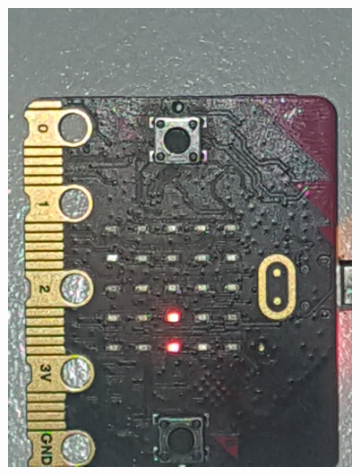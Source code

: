 \begin{figure}[h!]
\begin{subfigure}[b]{0.19\textwidth}
		     \includegraphics[width=.98\linewidth]{figuren/matrix/mDrie}
	   \end{subfigure}		
      \begin{subfigure}[b]{0.19\textwidth}

\end{subfigure}
\end{figure}
